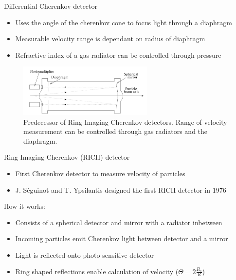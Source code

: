 \documentclass[aspectratio=1610, 10pt]{beamer}
\begin{document}
\begin{frame}{Differential Cherenkov detector}
  \begin{itemize}
    \item Uses the angle of the cherenkov cone to focus light through a diaphragm
    \medskip
    \item Measurable velocity range is dependant on radius of diaphragm
    \medskip
    \item Refractive index of a gas radiator can be controlled through pressure
  \end{itemize}
    \begin{figure}
      \includegraphics[width=0.6\textwidth]{images/differential.png}
      \caption{Predecessor of Ring Imaging Cherenkov detectors. Range of velocity measurement can be controlled through
      gas radiators and the diaphragm.}
    \end{figure}
\end{frame}

\begin{frame}{Ring Imaging Cherenkov (RICH) detector}
  \begin{itemize}
    \item First Cherenkov detector to measure velocity of particles
    \medskip
    \item J. S\'{e}guinot and T. Ypsilantis designed the first RICH detector in 1976
  \end{itemize}
\vspace{0.5cm}
How it works:
\begin{itemize}
  \item Consists of a spherical detector and mirror with a radiator inbetween
  \medskip
  \item Incoming particles emit Cherenkov light between detector and a mirror
  \medskip
  \item Light is reflected onto photo sensitive detector
  \medskip
  \item Ring shaped reflections enable calculation of velocity ($\Theta = 2 \frac{R_c}{R}$)
\end{itemize}
\end{frame}
\end{document}
